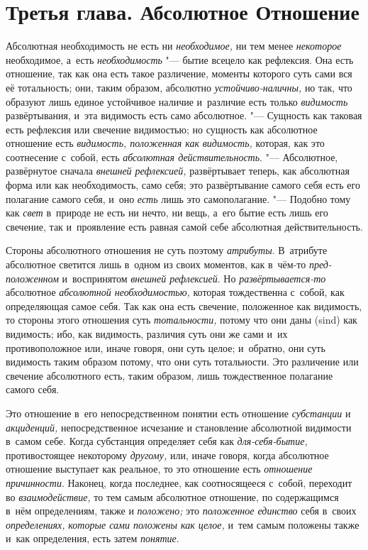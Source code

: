 \chapter[{\em Третья глава} Абсолютное Отношение]{Третья глава. Абсолютное Отношение}

Абсолютная необходимость не есть ни {\em необходимое,} ни тем менее
{\em некоторое} необходимое, а~есть
{\em необходимость} "--- бытие всецело как рефлексия. Она
есть отношение, так как она есть такое различение, моменты которого суть
сами вся её тотальность; они, таким образом, абсолютно
{\em устойчиво-наличны,} но так, что образуют лишь
единое устойчивое наличие и~различие есть только
{\em видимость} развёртывания, и~эта видимость есть
само абсолютное. "--- Сущность как таковая есть рефлексия или свечение
видимостью; но сущность как абсолютное отношение есть
{\em видимость, положенная как
}{\em видимость,} которая, как это соотнесение с~собой,
есть {\em абсолютная действительность}. "--- Абсолютное,
развёрнутое сначала {\em внешней рефлексией,}
развёртывает теперь, как абсолютная форма или как необходимость, само себя;
это развёртывание самого себя есть его полагание самого себя, и~оно
{\em есть} лишь это самополагание. "--- Подобно тому как
{\em свет} в~природе не есть ни нечто, ни вещь, а~его
бытие есть лишь его свечение, так и~проявление есть равная самой себе
абсолютная действительность.

Стороны абсолютного отношения не суть поэтому {\em атрибуты}. В~атрибуте
абсолютное светится лишь в~одном из своих моментов, как в~чём-то
{\em пред-положенном} и~воспринятом {\em внешней рефлексией}.
Но {\em развёртывается-то} абсолютное {\em абсолютной необходимостью,} которая
тождественна с~собой, как определяющая самое себя. Так как она есть свечение,
положенное как видимость, то стороны этого отношения суть {\em тотальности,}
потому что они даны (sind) как видимость; ибо, как видимость, различия суть они
же сами и~их противоположное или, иначе говоря, они суть целое; и~обратно, они
суть видимость таким образом потому, что они суть тотальности. Это различение
или свечение абсолютного есть, таким образом, лишь тождественное полагание
самого себя.

Это отношение в~его непосредственном понятии есть отношение
{\em субстанции} и {\em акциденций,} непосредственное исчезание и
становление абсолютной видимости в~самом себе. Когда субстанция определяет
себя как {\em для-себя-бытие,} противостоящее
некоторому {\em другому,} или, иначе говоря, когда
абсолютное отношение выступает как реальное, то это отношение есть
{\em отношение причинности}. Наконец, когда последнее,
как соотносящееся с~собой, переходит во
{\em взаимодействие,} то тем самым абсолютное
отношение, по содержащимся в~нём определениям, также и
{\em положено;} это {\em положенное
единство} себя в~своих {\em определениях,}
{\em которые сами положены как целое,} и~тем самым
положены также и~как определения, есть затем {\em понятие}.

